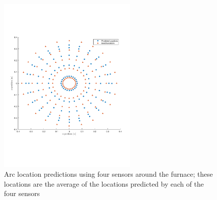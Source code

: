 \documentclass[onehalf,11pt]{beavtex}
\begin{document}
\begin{figure}[htbp]
\centering
	\includegraphics[width=0.6\textwidth]{foursenspred.pdf}
	\caption{Arc location predictions using four sensors around the furnace; these locations are the average of the locations predicted by each of the four sensors}
	\label{fig:4ave}
\end{figure}
\end{document}
